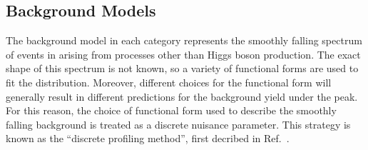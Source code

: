 \subsection{Background Models} \label{sec:tth_bkg_models}
The background model in each category represents the smoothly falling spectrum of events in \mgg arising from processes other than Higgs boson production.
The exact shape of this spectrum is not known, so a variety of functional forms are used to fit the \mgg distribution.
Moreover, different choices for the functional form will generally result in different predictions for the background yield under the \mH peak.
For this reason, the choice of functional form used to describe the smoothly falling background is treated as a discrete nuisance parameter.
This strategy is known as the ``discrete profiling method'', first decribed in Ref.~\cite{envelope}.

